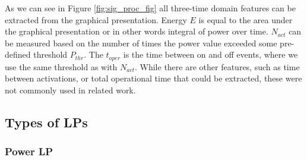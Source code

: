 As we can see in Figure \ref{fig:sig_proc_fig} all three-time domain features can be extracted from the graphical presentation. 
Energy $E$ is equal to the area under the graphical presentation or in other words integral of power over time. 
$N_{act}$ can be measured based on the number of times the power value exceeded some pre-defined threshold $P_{thr}$. 
The $t_{oper}$ is the time between on and off events, where we use the same threshold as with $N_{act}$.
While there are other features, such as time between activations, or total operational time that could be
extracted, these were not commonly used in related work.




\subsection{Types of LPs} 

\subsubsection{Power LP}
\label{ssec:feature_set}

